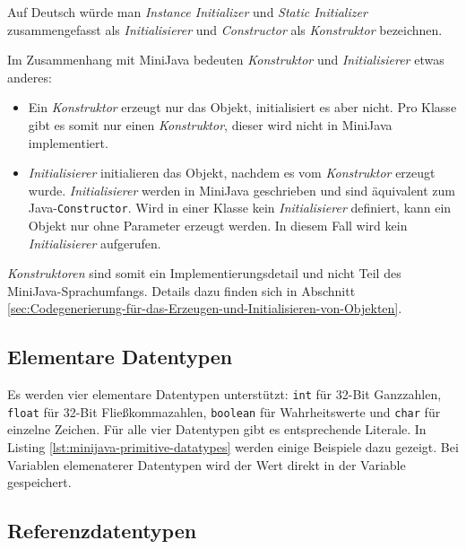 

Auf Deutsch würde man \emph{Instance Initializer} und \emph{Static Initializer} zusammengefasst als \emph{Initialisierer} und \emph{Constructor} als \emph{Konstruktor} bezeichnen.

Im Zusammenhang mit MiniJava bedeuten \emph{Konstruktor} und \emph{Initialisierer} etwas anderes:
\begin{itemize}
    \item Ein \emph{Konstruktor} erzeugt nur das Objekt, initialisiert es aber nicht. Pro Klasse gibt es somit nur einen \emph{Konstruktor}, dieser wird nicht in MiniJava implementiert. 
    \item \emph{Initialisierer} initialieren das Objekt, nachdem es vom \emph{Konstruktor} erzeugt wurde. \emph{Initialisierer} werden in MiniJava geschrieben und sind äquivalent zum Java-\lstinline{Constructor}. Wird in einer Klasse kein \emph{Initialisierer} definiert, kann ein Objekt nur ohne Parameter erzeugt werden. In diesem Fall wird kein \emph{Initialisierer} aufgerufen.
\end{itemize}

\emph{Konstruktoren} sind somit ein Implementierungsdetail und nicht Teil des MiniJava-Sprachumfangs. Details dazu finden sich in Abschnitt \ref{sec:Codegenerierung-für-das-Erzeugen-und-Initialisieren-von-Objekten}.

\subsection{Elementare Datentypen}

Es werden vier elementare Datentypen unterstützt: \lstinline{int} für 32-Bit Ganzzahlen, \lstinline{float} für 32-Bit Fließkommazahlen, \lstinline{boolean} für Wahrheitswerte und \lstinline{char} für einzelne Zeichen. Für alle vier Datentypen gibt es entsprechende Literale. In Listing \ref{lst:minijava-primitive-datatypes} werden einige Beispiele dazu gezeigt. Bei Variablen elemenaterer Datentypen wird der Wert direkt in der Variable gespeichert.



\subsection{Referenzdatentypen}

